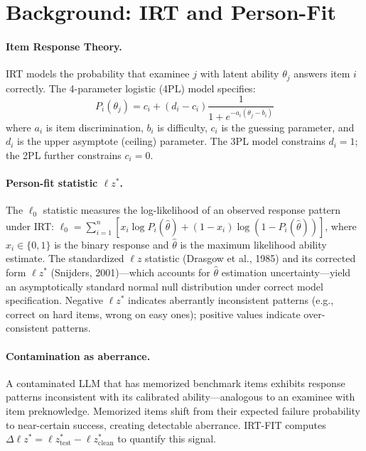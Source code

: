 \documentclass[11pt,a4paper]{article}
\begin{document}
\section{Background: IRT and Person-Fit}
\label{sec:background}

\paragraph{Item Response Theory.}
IRT models the probability that examinee $j$ with latent ability $\theta_j$ answers item $i$ correctly.
The 4-parameter logistic (4PL) model specifies:
\begin{equation}
P_i(\theta_j) = c_i + (d_i - c_i) \frac{1}{1 + e^{-a_i(\theta_j - b_i)}}
\label{eq:4pl}
\end{equation}
where $a_i$ is item discrimination, $b_i$ is difficulty, $c_i$ is the guessing parameter, and $d_i$ is the upper asymptote (ceiling) parameter.
The 3PL model constrains $d_i{=}1$; the 2PL further constrains $c_i{=}0$.

\paragraph{Person-fit statistic $\ell z^*$.}
The $\ell_0$ statistic measures the log-likelihood of an observed response pattern under IRT:
$\ell_0 = \sum_{i=1}^{n} [x_i \log P_i(\hat{\theta}) + (1{-}x_i)\log(1{-}P_i(\hat{\theta}))]$,
where $x_i \in \{0,1\}$ is the binary response and $\hat{\theta}$ is the maximum likelihood ability estimate.
The standardized $\ell z$ statistic (Drasgow et al., 1985) and its corrected form $\ell z^*$ (Snijders, 2001)---which accounts for $\hat{\theta}$ estimation uncertainty---yield an asymptotically standard normal null distribution under correct model specification.
Negative $\ell z^*$ indicates aberrantly inconsistent patterns (e.g., correct on hard items, wrong on easy ones); positive values indicate over-consistent patterns.

\paragraph{Contamination as aberrance.}
A contaminated LLM that has memorized benchmark items exhibits response patterns inconsistent with its calibrated ability---analogous to an examinee with item preknowledge.
Memorized items shift from their expected failure probability to near-certain success, creating detectable aberrance.
IRT-FIT computes $\Delta \ell z^* = \ell z^*_{\text{test}} - \ell z^*_{\text{clean}}$ to quantify this signal.
\end{document}

